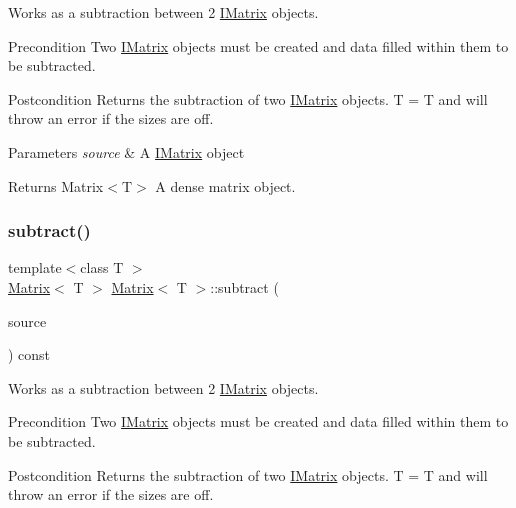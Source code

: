 Works as a subtraction between 2 \mbox{\hyperlink{class_i_matrix}{I\+Matrix}} objects. 

\begin{DoxyPrecond}{Precondition}
Two \mbox{\hyperlink{class_i_matrix}{I\+Matrix}} objects must be created and data filled within them to be subtracted. 
\end{DoxyPrecond}
\begin{DoxyPostcond}{Postcondition}
Returns the subtraction of two \mbox{\hyperlink{class_i_matrix}{I\+Matrix}} objects. T = T and will throw an error if the sizes are off.
\end{DoxyPostcond}

\begin{DoxyParams}{Parameters}
{\em source} & A \mbox{\hyperlink{class_i_matrix}{I\+Matrix}} object \\
\hline
\end{DoxyParams}
\begin{DoxyReturn}{Returns}
Matrix$<$\+T$>$ A dense matrix object. 
\end{DoxyReturn}
\mbox{\label{class_matrix_a772640d64a7742213fe09c7a9b9c63d3}} 
\subsubsection{\texorpdfstring{subtract()}{subtract()}\hspace{0.1cm}{\footnotesize\ttfamily [6/6]}}
{\footnotesize\ttfamily template$<$class T $>$ \\
\mbox{\hyperlink{class_matrix}{Matrix}}$<$ T $>$ \mbox{\hyperlink{class_matrix}{Matrix}}$<$ T $>$\+::subtract (\begin{DoxyParamCaption}\item[{const \mbox{\hyperlink{class_i_matrix}{I\+Matrix}}$<$ \mbox{\hyperlink{class_d_matrix}{D\+Matrix}}$<$ T $>$, T $>$ \&}]{source }\end{DoxyParamCaption}) const}



Works as a subtraction between 2 \mbox{\hyperlink{class_i_matrix}{I\+Matrix}} objects. 

\begin{DoxyPrecond}{Precondition}
Two \mbox{\hyperlink{class_i_matrix}{I\+Matrix}} objects must be created and data filled within them to be subtracted. 
\end{DoxyPrecond}
\begin{DoxyPostcond}{Postcondition}
Returns the subtraction of two \mbox{\hyperlink{class_i_matrix}{I\+Matrix}} objects. T = T and will throw an error if the sizes are off.
\end{DoxyPostcond}

